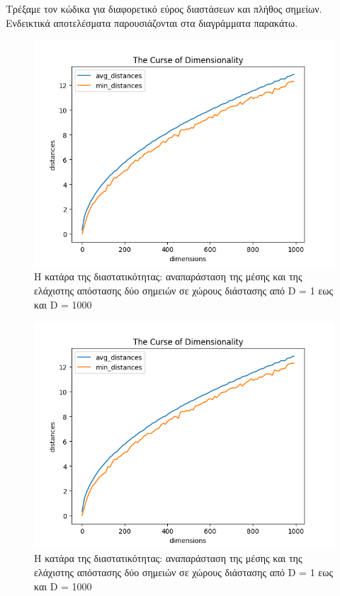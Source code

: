 \documentclass[12pt]{article}
\newenvironment{matlab}
	{\begin{figure}[H]\centering\captionsetup{justification=centering}}
	{\end{figure}}
\begin{document}
Τρέξαμε τον κώδικα για διαφορετικό εύρος διαστάσεων και πλήθος σημείων. Ενδεικτικά αποτελέσματα παρουσιάζονται στα διαγράμματα παρακάτω. \\

\begin{matlab}
	\includegraphics[scale=0.6]{images/the_curse_of_dimensionality_1_to_1000.png}
	\caption{Η κατάρα της διαστατικότητας: αναπαράσταση της μέσης και της ελάχιστης απόστασης δύο σημειών σε χώρους διάστασης από D = 1 εως και D = 1000}
\end{matlab}

\begin{matlab}
	\includegraphics[scale=0.6]{images/the_curse_of_dimensionality_1_to_1000.png}
	\caption{Η κατάρα της διαστατικότητας:  αναπαράσταση της μέσης και της ελάχιστης απόστασης δύο σημειών σε χώρους διάστασης από D = 1 εως και D = 1000}
\end{matlab}
\end{document}
